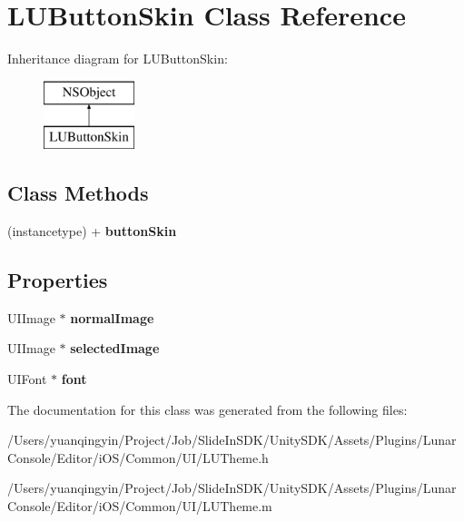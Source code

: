 \hypertarget{interface_l_u_button_skin}{}\section{L\+U\+Button\+Skin Class Reference}
\label{interface_l_u_button_skin}
Inheritance diagram for L\+U\+Button\+Skin\+:\begin{figure}[H]
\begin{center}
\leavevmode
\includegraphics[height=2.000000cm]{interface_l_u_button_skin}
\end{center}
\end{figure}
\subsection*{Class Methods}
\begin{DoxyCompactItemize}
\item 
\mbox{\label{interface_l_u_button_skin_a6518330cd6a7cbccc0d659ca2962f959}} 
(instancetype) + {\bfseries button\+Skin}
\end{DoxyCompactItemize}
\subsection*{Properties}
\begin{DoxyCompactItemize}
\item 
\mbox{\label{interface_l_u_button_skin_a527dedec9cef646aefebad42d0ae1110}} 
U\+I\+Image $\ast$ {\bfseries normal\+Image}
\item 
\mbox{\label{interface_l_u_button_skin_a0568fc45d666ef7d28b8487ed1369b8c}} 
U\+I\+Image $\ast$ {\bfseries selected\+Image}
\item 
\mbox{\label{interface_l_u_button_skin_a20ccd2415a92ac64743398522ba34ed3}} 
U\+I\+Font $\ast$ {\bfseries font}
\end{DoxyCompactItemize}


The documentation for this class was generated from the following files\+:\begin{DoxyCompactItemize}
\item 
/\+Users/yuanqingyin/\+Project/\+Job/\+Slide\+In\+S\+D\+K/\+Unity\+S\+D\+K/\+Assets/\+Plugins/\+Lunar\+Console/\+Editor/i\+O\+S/\+Common/\+U\+I/L\+U\+Theme.\+h\item 
/\+Users/yuanqingyin/\+Project/\+Job/\+Slide\+In\+S\+D\+K/\+Unity\+S\+D\+K/\+Assets/\+Plugins/\+Lunar\+Console/\+Editor/i\+O\+S/\+Common/\+U\+I/L\+U\+Theme.\+m\end{DoxyCompactItemize}
